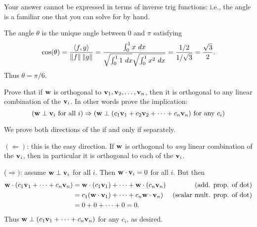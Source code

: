Your answer cannot be expressed in terms of inverse trig functions: i.e., the angle is a familiar one that you can solve for by hand. 
\\
\begin{solution}
\noindent
The angle $\theta$ is the unique angle between 0 and $\pi$ satisfying 
\[
\cos(\theta)=\frac{\angvec{f,g}}{\norm{f}\norm{g}}=\frac{\int_0^1x \ dx}{\sqrt{\int_0^11\ dx}\sqrt{\int_0^1 x^2 \ dx}}=\frac{1/2}{1/\sqrt{3}}=\frac{\sqrt{3}}{2}.
\] 
Thus $\theta=\pi/6$. 
\end{solution} 
\ii Prove that if ${\mathbf w}$ is orthogonal to ${\mathbf v}_1,{\mathbf v}_2,\dots, {\mathbf v}_n$, then it is orthogonal to any linear combination of the ${\mathbf v}_i$. In other words prove the implication:
\[
({\mathbf w}\perp{\mathbf v}_i \text{ for all $i$})\Rightarrow ({\mathbf w}\perp(c_1{\mathbf v}_1+c_2{\mathbf v}_2+\cdots+c_n{\mathbf v}_n) \text{ for any $c_i$})
\]
\begin{solution}
We prove both directions of the if and only if separately. 

$(\Leftarrow)$: this is the easy direction. If ${\mathbf w}$ is orthogonal to {\em any} linear combination of the ${\mathbf v}_i$, then in particular it is orthogonal to each of the ${\mathbf v}_i$. 

($\Rightarrow)$: assume ${\mathbf w}\perp{\mathbf v}_i$ for all $i$. Then ${\mathbf w}\cdot{\mathbf v}_i=0$ for all $i$. But then 
\begin{align*}
{\mathbf w}\cdot(c_1{\mathbf v}_1+\cdots +c_n{\mathbf v}_n)&={\mathbf w}\cdot(c_1{\mathbf v}_1)+\cdots +{\mathbf w}\cdot(c_n{\mathbf v}_n) &\text{(add. prop. of dot)}\\
&=c_1({\mathbf w}\cdot{\mathbf v}_1)+\cdots +c_n{\mathbf w}\cdot{\mathbf v}_n) &\text{(scalar mult. prop. of dot)}\\
&=0+0+\cdots +0=0.
\end{align*}
Thus ${\mathbf w}\perp(c_1{\mathbf v}_1+\cdots +c_n{\mathbf v}_n)$ for any $c_i$, as desired. 
\end{solution}

